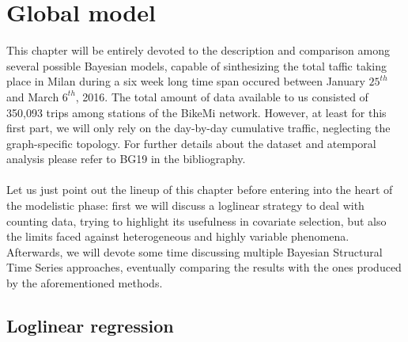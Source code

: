 \documentclass[11pt,twoside]{report}
\begin{document}
\chapter{Global model}
This chapter will be entirely devoted to the description and comparison among several possible Bayesian models, capable of sinthesizing the total taffic taking place in Milan during a six week long time span occured between January $ 25^{th} $ and March $ 6^{th} $, 2016. The total amount of data available to us consisted of 350,093 trips among stations of the BikeMi network. However, at least for this first part, we will only rely on the day-by-day cumulative traffic, neglecting the graph-specific topology. For further details about the dataset and atemporal analysis please refer to BG19 in the bibliography.\\
\\
Let us just point out the lineup of this chapter before entering into the heart of the modelistic phase: first we will discuss a loglinear strategy to deal with counting data, trying to highlight its usefulness in  covariate selection, but also the limits faced against heterogeneous and highly variable phenomena. Afterwards, we will devote some time discussing multiple Bayesian Structural Time Series approaches, eventually comparing the results with the ones produced by the aforementioned methods.

\section{Loglinear regression}
\end{document}

